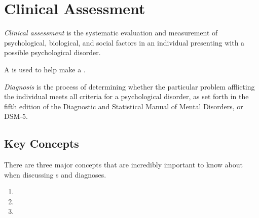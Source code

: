 \section{Clinical Assessment}\label{sec:Clinical_Assessment}
\begin{definition}\label{def:Clinical_Assessment}
  \emph{Clinical assessment} is the systematic evaluation and measurement of psychological, biological, and social factors in an individual presenting with a possible psychological disorder.
\end{definition}

A  is used to help make a .

\begin{definition}[Diagnosis]\label{def:Diagnosis}
  \emph{Diagnosis} is the process of determining whether the particular problem afflicting the individual meets all criteria for a psychological disorder, as set forth in the fifth edition of the Diagnostic and Statistical Manual of Mental Disorders, or DSM-5.
\end{definition}

\subsection{Key Concepts}\label{subsec:Key_Clinical_Assessment_Concepts}
There are three major concepts that are incredibly important to know about when discussing s and diagnoses.

\begin{enumerate}[noitemsep]
\item {}
\item {}
\item {}
\end{enumerate}


